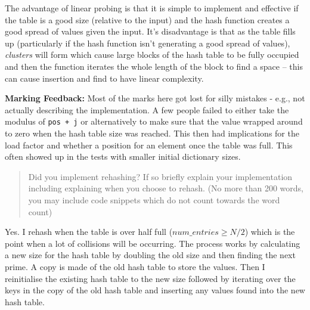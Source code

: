 \documentclass[a4]{article}
\newif\ifjava
\newif\ifpython
\begin{document}
\ifjava
\begin{verbatim}
for(int j = 1; j < N; j++){
            int look = (pos + j) % N;
            if(cells[look] == null)
                    return false;
            if(cells[look].compareTo(value) == 0) {
                     return true;
             }
}
\end{verbatim}
\fi


\ifpython
\begin{verbatim}
for j in range(1, N):
                look = (pos + j) % N
                if (self.cells[look] == None):
                    return False
                if (self.cells[look] != None and self.cells[look] == value):
                    return True
\end{verbatim}
\fi

The advantage of linear probing is that it is simple to implement and effective if the table is a good size (relative to the input) and the hash function creates a good spread of values given the input.  It's disadvantage is that as the table fills up (particularly if the hash function isn't generating a good spread of values), \emph{clusters} will form which cause large blocks of the hash table to be fully occupied and then the function iterates the whole length of the block to find a space -- this can cause insertion and find to have linear complexity.

{\bf Marking Feedback:}  Most of the marks here got lost for silly mistakes - e.g., not actually describing the implementation.  A few people failed to either take the modulus of \texttt{pos + j} or alternatively to make sure that the value wrapped around to zero when the hash table size was reached.  This then had implications for the load factor and whether a position for an element once the table was full.  This often showed up in the tests with smaller initial dictionary sizes.

\begin{quote}
Did you implement rehashing? If so briefly explain your implementation including explaining when you choose to rehash.  (No more than 200 words, you may include code snippets which do not count towards the word count)
\end{quote}

Yes.  I rehash when the table is over half full ($num\_entries \geq N/2$) which is the point when a lot of collisions will be occurring.  The process works by calculating a new size for the hash table by doubling the old size and then finding the next prime.  A copy is made of the old hash table to store the values.  Then I reinitialise the existing hash table to the new size followed by iterating over the keys in the copy of the old hash table and inserting any values found into the new hash table.
\end{document}
